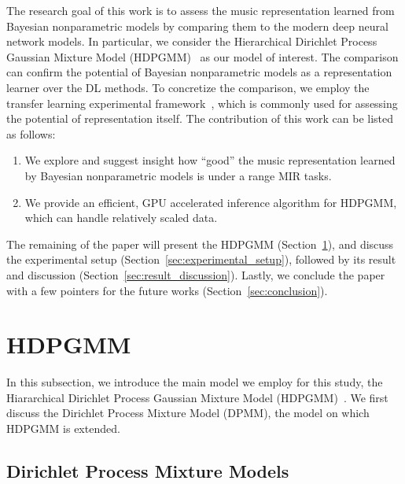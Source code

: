 \documentclass{article}
\begin{document}
The research goal of this work is to assess the music representation learned from Bayesian nonparametric models by comparing them to the modern deep neural network models. In particular, we consider the Hierarchical Dirichlet Process Gaussian Mixture Model (HDPGMM)~\cite{DBLP:journals/jmlr/WangPB11,DBLP:conf/ismir/YoshiiG09,doi:10.1198/016214506000000302} as our model of interest. The comparison can confirm the potential of Bayesian nonparametric models as a representation learner over the DL methods.
	To concretize the comparison, we employ the transfer learning experimental framework~\cite{DBLP:journals/nca/KimULH20, DBLP:conf/ismir/ChoiFSC17, DBLP:conf/ismir/DielemanBS11}, which is commonly used for assessing the potential of representation itself. The contribution of this work can be listed as follows:

\begin{enumerate}[noitemsep]
    \item We explore and suggest insight how ``good'' the music representation learned by Bayesian nonparametric models is under a range MIR tasks.
    \item We provide an efficient, GPU accelerated inference algorithm for HDPGMM, which can handle relatively scaled data.
\end{enumerate}

The remaining of the paper will present the HDPGMM (Section~\ref{sec:hdpgmm}), and discuss the experimental setup (Section~\ref{sec:experimental_setup}), followed by its result and discussion (Section~\ref{sec:result_discussion}). Lastly, we conclude the paper with a few pointers for the future works (Section~\ref{sec:conclusion}).


\section{HDPGMM}\label{sec:hdpgmm}

In this subsection, we introduce the main model we employ for this study, the Hiararchical Dirichlet Process Gaussian Mixture Model (HDPGMM)~\cite{DBLP:conf/ismir/HoffmanBC08, doi:10.1198/016214506000000302}. We first discuss the Dirichlet Process Mixture Model (DPMM), the model on which HDPGMM is extended.

\subsection{Dirichlet Process Mixture Models}\label{sec:hdpgmm:dpmm}
\end{document}

